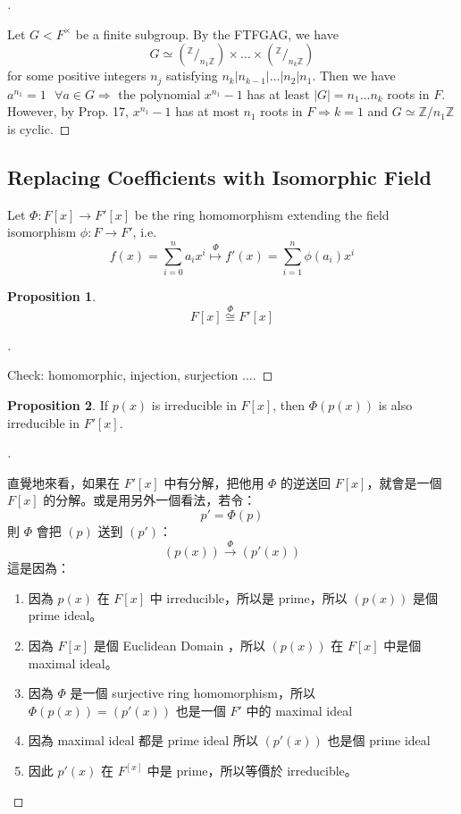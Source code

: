 \documentclass[12pt]{article}
\newcommand{\sfa}{\text{  } \forall}
\theoremstyle{definition}
\newtheorem{prop}{Proposition}
\newenvironment{proofs}[1][\proofname]{%
  \begin{proof}[#1]$ $\par\nobreak\ignorespaces
}{%
  \end{proof}
}
\newcommand*\quot[2]{{^{\textstyle #1}\big/_{\textstyle #2}}}
\begin{document}
\begin{proofs}
	Let $G < F^\times$ be a finite subgroup. By the FTFGAG, we have
	\[
		G \simeq (\quot{\mathbb{Z}}{n_1 \mathbb{Z}}) \times \hdots \times (\quot{\mathbb{Z}}{n_k\mathbb{Z}})
	\]
	for some positive integers $n_j$ satisfying $n_k |n_{k - 1}| \hdots |n_2| n_1$. Then we have $a^{n_1} = 1 \sfa a \in G \Rightarrow $ the polynomial $x^{n_1} - 1$ has at least $|G| = n_1 \hdots n_k$ roots in $F$. However, by Prop. 17, $x^{n_1} - 1$ has at most $n_1$ roots in $F \Rightarrow k = 1$ and $G \simeq \mathbb{Z}/n_1 \mathbb{Z}$ is cyclic.
\end{proofs}

\subsection{Replacing Coefficients with Isomorphic Field}
Let ${\Phi}:F[x]\to F'[x]$ be the ring homomorphism extending the field isomorphism $\phi:F\to F'$, i.e.
\[f(x)=\sum_{i=0}^n a_i x^i \overset{{\Phi}}{\mapsto} f'(x)=\sum_{i=1}^n \phi(a_i) x^i\]
\begin{prop}
	\[F[x]\overset{\Phi}{\cong} F'[x] \]
\end{prop}

\begin{proofs}
	Check: homomorphic, injection, surjection ....
\end{proofs}

\begin{prop}
	If $p(x)$ is irreducible in $F[x]$, then $\Phi(p(x))$ is also irreducible in $F'[x]$.
\end{prop}

\begin{proofs}

	直覺地來看，如果在 $F'[x]$ 中有分解，把他用 $\Phi$ 的逆送回 $F[x]$，就會是一個 $F[x]$ 的分解。或是用另外一個看法，若令：
	$$
		p' = \Phi(p)
	$$
	則 $\Phi$ 會把 $(p)$ 送到 $(p')$：
	$$
		(p(x)) \overset{\Phi}{\to}(p'(x))
	$$
	這是因為：
	\begin{enumerate}
		\item 因為 $p(x)$ 在 $F[x]$ 中 irreducible，所以是 prime，所以 $(p(x))$ 是個 prime ideal。
		\item 因為 $F[x]$ 是個 Euclidean Domain ，所以 $(p(x))$ 在 $F[x]$ 中是個 maximal ideal。
		\item 因為 $\Phi$ 是一個 surjective ring homomorphism，所以 $\Phi(p(x)) = (p'(x))$ 也是一個 $F'$ 中的 maximal ideal
		\item 因為 maximal ideal 都是 prime ideal 所以 $(p'(x))$ 也是個 prime ideal
		\item 因此 $p'(x)$ 在 $F^[x]$ 中是 prime，所以等價於 irreducible。
	\end{enumerate}
\end{proofs}
\end{document}
